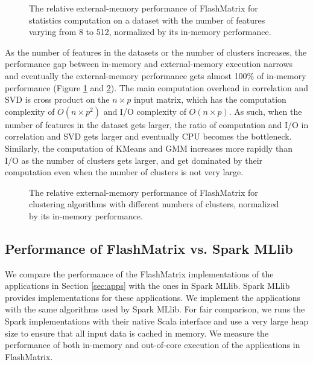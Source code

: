 \begin{figure}
	\begin{center}
		\footnotesize
		
		\caption{The relative external-memory performance of FlashMatrix for
			statistics computation on a dataset with the number of features
		varying from 8 to 512, normalized by its in-memory performance.}
		\label{perf:stat}
	\end{center}
\end{figure}

As the number of features in the datasets or the number of clusters increases,
the performance gap between in-memory and external-memory execution
narrows and eventually the external-memory performance gets almost 100\%
of in-memory performance (Figure \ref{perf:stat} and \ref{perf:clust}).
The main computation overhead in correlation and SVD is cross product on
the $n \times p$ input matrix, which has the computation complexity of
$O(n \times p^2)$ and I/O complexity of $O(n \times p)$. As such, when
the number of features in the dataset gets larger, the ratio of computation
and I/O in correlation and SVD gets larger and eventually CPU becomes
the bottleneck. Similarly, the computation of KMeans and GMM increases
more rapidly than I/O as the number of clusters gets larger, and get
dominated by their computation even when the number of clusters is not
very large.

\begin{figure}
	\begin{center}
		\footnotesize
		
		\caption{The relative external-memory performance of FlashMatrix for
			clustering algorithms with different numbers of clusters, normalized
		by its in-memory performance.}
		\label{perf:clust}
	\end{center}
\end{figure}

\subsection{Performance of FlashMatrix vs. Spark MLlib}

We compare the performance of the FlashMatrix implementations of the applications
in Section \ref{sec:apps} with the ones in Spark MLlib. Spark MLlib provides
implementations for these applications. We implement the applications with
the same algorithms used by Spark MLlib. For fair comparison, we runs the Spark
implementations with their native Scala interface and use a very large heap size
to ensure that all input data is cached in memory. We measure the performance
of both in-memory and out-of-core execution of the applications in FlashMatrix.

